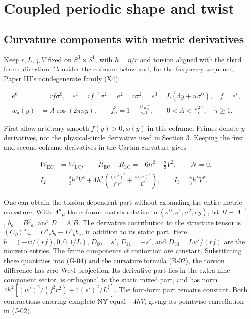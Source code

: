 \section{Coupled periodic shape and twist}
\label{sec:coupled}

\subsection{Curvature components with metric derivatives}

Keep $r,L,\eta,V$ fixed on $S^3\times S^1$, with $h=\eta/r$ and torsion
aligned with the third frame direction. Consider the coframe below and,
for the frequency sequence, Paper III's nondegenerate family (X4):

\begin{equation}\tag{J-01}\label{eq:J-01}
\begin{aligned}
e^0&=rf\sigma^0,\quad e^1=rf^{-1}\sigma^1,\quad e^2=r\sigma^2,
\quad e^3=L(\mathrm{d}y+w\sigma^0),\quad f=e^s,\\
w_n(y)&=A\cos(2\pi ny),\qquad
f_n^2=1-\frac{L^2w_n^2}{2r^2},\qquad
0<A<\frac{\sqrt2r}{L},\quad n\ge1.
\end{aligned}
\end{equation}

First allow arbitrary smooth $f(y)>0,w(y)$ in this coframe. Primes denote
$y$ derivatives, not the physical-circle derivative used in Section 3.
Keeping the first and second coframe derivatives in the Cartan curvature gives

\begin{equation}\tag{J-02}\label{eq:J-02}
\begin{aligned}
W_{\mathrm{EC}}&=W_{\mathrm{LC}},\qquad
R_{\mathrm{EC}}-R_{\mathrm{LC}}=-6h^2-\frac23V^2,\qquad\mathcal N=0,\\
I_2&=\frac83h^2V^2+4h^2\left(\frac{(w')^2}{f^2r^2}+\frac{4(s')^2}{L^2}\right),
\qquad I_3=\frac83h^2V^2.
\end{aligned}
\end{equation}

One can obtain the torsion-dependent part without expanding the entire metric
curvature. With $A^a{}_{\mu}$ the coframe matrix relative to
$(\sigma^0,\sigma^1,\sigma^2,\mathrm{d}y)$, let $B=A^{-1}$,
$b_a=B^y{}_a$, and $D=A'B$. The derivative contribution to the structure tensor
is $(C_{\partial})^a{}_{bc}=D^a{}_c b_b-D^a{}_b b_c$, in addition to its static part.
Here $b=(-w/(rf),0,0,1/L)$, $D_{00}=s'$, $D_{11}=-s'$, and
$D_{30}=Lw'/(rf)$ are the nonzero entries. The frame components of contortion
are constant. Substituting these quantities into (G-04) and the curvature
formula (B-02), the torsion difference has zero Weyl projection. Its derivative
part lies in the extra nine-component sector, is orthogonal to the static
mixed part, and has norm $4h^2[(w')^2/(f^2r^2)+4(s')^2/L^2]$.
The four-form part remains constant. Both contractions entering complete NY
equal $-4hV$, giving its pointwise cancellation in (J-02).

